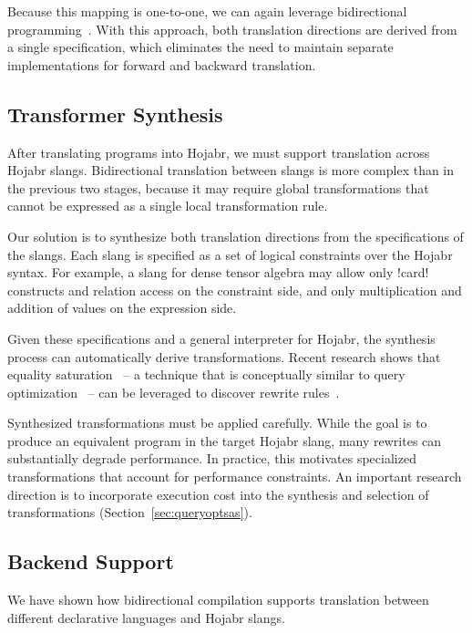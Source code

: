 \documentclass[sigconf,nonacm]{acmart}
\begin{document}
Because this mapping is one-to-one, we can again leverage bidirectional programming~\cite{foster2007combinators}. With this approach, both translation directions are derived from a single specification, which eliminates the need to maintain separate implementations for forward and backward translation.

\subsection{Transformer Synthesis}
\label{sec:inslang}
After translating programs into Hojabr, we must support translation across Hojabr slangs. Bidirectional translation between slangs is more complex than in the previous two stages, because it may require global transformations that cannot be expressed as a single local transformation rule.

Our solution is to synthesize both translation directions from the specifications of the slangs. Each slang is specified as a set of logical constraints over the Hojabr syntax. For example, a slang for dense tensor algebra may allow only !card! constructs and relation access on the constraint side, and only multiplication and addition of values on the expression side.

Given these specifications and a general interpreter for Hojabr, the synthesis process can automatically derive transformations. Recent research shows that equality saturation~\cite{willsey2021egg,schneider2025slotted,tate2009equality} -- a technique that is conceptually similar to query optimization~\cite{schleich2023optimizing} -- can be leveraged to discover rewrite rules~\cite{nandi2021rewrite,pal2023equality}.

Synthesized transformations must be applied carefully. While the goal is to produce an equivalent program in the target Hojabr slang, many rewrites can substantially degrade performance. In practice, this motivates specialized transformations that account for performance constraints. An important research direction is to incorporate execution cost into the synthesis and selection of transformations (Section~\ref{sec:queryoptsas}).

\subsection{Backend Support}
\label{sec:backend}
We have shown how bidirectional compilation supports translation between different declarative languages and Hojabr slangs.
\end{document}
